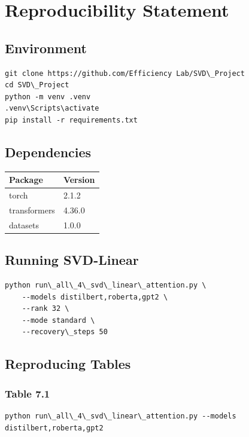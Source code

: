 
\section{Reproducibility Statement}

\subsection{Environment}

\begin{lstlisting}
git clone https://github.com/Efficiency Lab/SVD\_Project
cd SVD\_Project
python -m venv .venv
.venv\Scripts\activate
pip install -r requirements.txt
\end{lstlisting}

\subsection{Dependencies}

\begin{table}[H]
\centering
\small
\begin{tabular}{ll}
\toprule
\textbf{Package} & \textbf{Version} \\
\midrule
torch & 2.1.2 \\
transformers & 4.36.0 \\
datasets & 1.0.0 \\
\bottomrule
\end{tabular}
\end{table}

\subsection{Running SVD-Linear}

\begin{lstlisting}
python run\_all\_4\_svd\_linear\_attention.py \
    --models distilbert,roberta,gpt2 \
    --rank 32 \
    --mode standard \
    --recovery\_steps 50
\end{lstlisting}

\subsection{Reproducing Tables}

\subsubsection{Table 7.1}
\begin{lstlisting}
python run\_all\_4\_svd\_linear\_attention.py --models distilbert,roberta,gpt2
\end{lstlisting}

